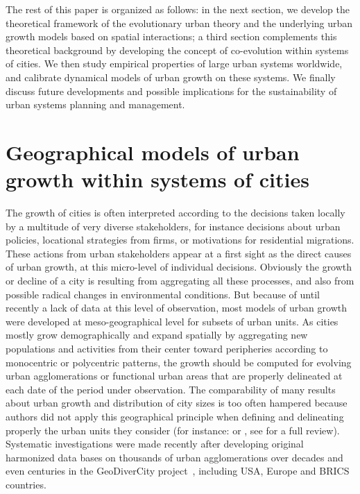 \documentclass[11pt]{article}
\begin{document}
The rest of this paper is organized as follows: in the next section, we develop the theoretical framework of the evolutionary urban theory and the underlying urban growth models based on spatial interactions; a third section complements this theoretical background by developing the concept of co-evolution within systems of cities. We then study empirical properties of large urban systems worldwide, and calibrate dynamical models of urban growth on these systems. We finally discuss future developments and possible implications for the sustainability of urban systems planning and management.


\section{Geographical models of urban growth within systems of cities}


The growth of cities is often interpreted according to the decisions taken locally by a multitude of very diverse stakeholders, for instance decisions about urban policies, locational strategies from firms, or motivations for residential migrations. These actions from urban stakeholders appear at a first sight as the direct causes of urban growth, at this micro-level of individual decisions. Obviously the growth or decline of a city is resulting from aggregating all these processes, and also from possible radical changes in environmental conditions.  But because of until recently a lack of data at this level of observation, most models of urban growth were developed at meso-geographical level for subsets of urban units. As cities mostly grow demographically and expand spatially by aggregating new populations and activities from their center toward peripheries according to monocentric or polycentric patterns, the growth should be computed for evolving urban agglomerations or functional urban areas that are properly delineated at each date of the period under observation. The comparability of many results about urban growth and distribution of city sizes is too often hampered because authors did not apply this geographical principle when defining and delineating properly the urban units they consider (for instance: \cite{eeckhout2004gibrat} or \cite{xu2014discontinuities}, see \cite{cottineau2017metazipf} for a full review). Systematic investigations were made recently after developing original harmonized data bases on thousands of urban agglomerations over decades and even centuries in the GeoDiverCity project~\cite{pumain2015multilevel,cura2017old,pumain2017urban}, including USA, Europe and BRICS countries.
\end{document}
